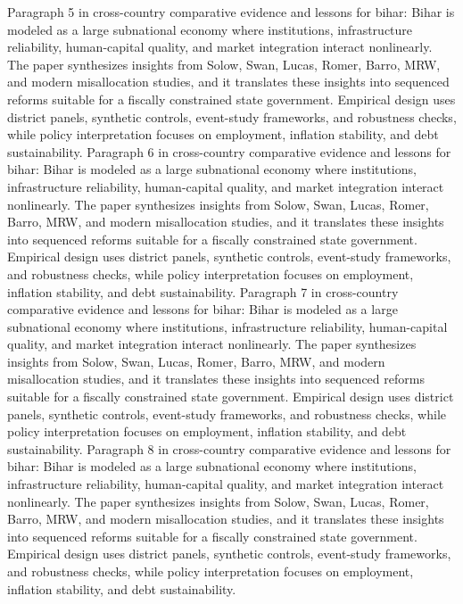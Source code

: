 \documentclass[preprint,12pt]{elsarticle}
\begin{document}
Paragraph 5 in cross-country comparative evidence and lessons for bihar: Bihar is modeled as a large subnational economy where institutions, infrastructure reliability, human-capital quality, and market integration interact nonlinearly. The paper synthesizes insights from Solow, Swan, Lucas, Romer, Barro, MRW, and modern misallocation studies, and it translates these insights into sequenced reforms suitable for a fiscally constrained state government. Empirical design uses district panels, synthetic controls, event-study frameworks, and robustness checks, while policy interpretation focuses on employment, inflation stability, and debt sustainability.
Paragraph 6 in cross-country comparative evidence and lessons for bihar: Bihar is modeled as a large subnational economy where institutions, infrastructure reliability, human-capital quality, and market integration interact nonlinearly. The paper synthesizes insights from Solow, Swan, Lucas, Romer, Barro, MRW, and modern misallocation studies, and it translates these insights into sequenced reforms suitable for a fiscally constrained state government. Empirical design uses district panels, synthetic controls, event-study frameworks, and robustness checks, while policy interpretation focuses on employment, inflation stability, and debt sustainability.
Paragraph 7 in cross-country comparative evidence and lessons for bihar: Bihar is modeled as a large subnational economy where institutions, infrastructure reliability, human-capital quality, and market integration interact nonlinearly. The paper synthesizes insights from Solow, Swan, Lucas, Romer, Barro, MRW, and modern misallocation studies, and it translates these insights into sequenced reforms suitable for a fiscally constrained state government. Empirical design uses district panels, synthetic controls, event-study frameworks, and robustness checks, while policy interpretation focuses on employment, inflation stability, and debt sustainability.
Paragraph 8 in cross-country comparative evidence and lessons for bihar: Bihar is modeled as a large subnational economy where institutions, infrastructure reliability, human-capital quality, and market integration interact nonlinearly. The paper synthesizes insights from Solow, Swan, Lucas, Romer, Barro, MRW, and modern misallocation studies, and it translates these insights into sequenced reforms suitable for a fiscally constrained state government. Empirical design uses district panels, synthetic controls, event-study frameworks, and robustness checks, while policy interpretation focuses on employment, inflation stability, and debt sustainability.
\end{document}
